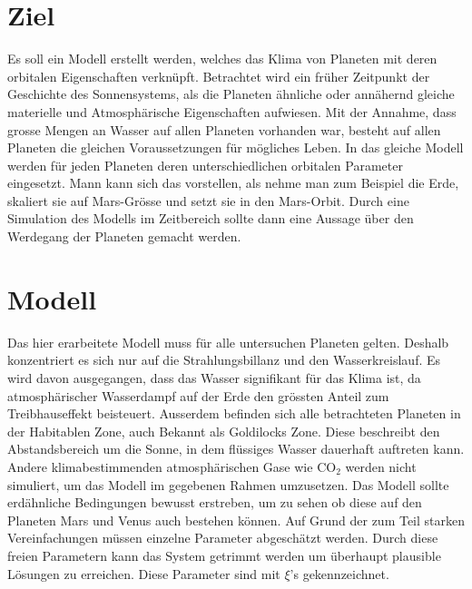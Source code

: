 \begin{refsection}

\section{Ziel}
Es soll ein Modell erstellt werden, welches das Klima von Planeten mit deren orbitalen Eigenschaften verknüpft.
Betrachtet wird ein früher Zeitpunkt der Geschichte des Sonnensystems, als die Planeten ähnliche oder annähernd gleiche materielle und Atmosphärische Eigenschaften aufwiesen.
Mit der Annahme, dass grosse Mengen an Wasser auf allen Planeten vorhanden war, besteht auf allen Planeten die gleichen Voraussetzungen für mögliches Leben.
In das gleiche Modell werden für jeden Planeten deren unterschiedlichen orbitalen Parameter eingesetzt. Mann kann sich das vorstellen, als nehme man zum Beispiel die Erde, skaliert sie auf Mars-Grösse und setzt sie in den Mars-Orbit. 
Durch eine Simulation des Modells im Zeitbereich sollte dann eine Aussage über den Werdegang der Planeten gemacht werden.

\section{Modell}


	

	
	
	
	Das hier erarbeitete Modell muss für alle untersuchen Planeten gelten. Deshalb konzentriert es sich nur auf die Strahlungsbillanz und den Wasserkreislauf. Es wird davon ausgegangen, dass das Wasser signifikant für das Klima ist, da atmosphärischer Wasserdampf auf der Erde den grössten Anteil zum Treibhauseffekt beisteuert. Ausserdem befinden sich alle betrachteten Planeten in der Habitablen Zone, auch Bekannt als Goldilocks Zone. Diese beschreibt den Abstandsbereich um die Sonne, in dem flüssiges Wasser dauerhaft auftreten kann.
	Andere klimabestimmenden atmosphärischen Gase wie $\text{CO}_\text{2}$ werden nicht simuliert, um das Modell im gegebenen Rahmen umzusetzen.
	Das Modell sollte erdähnliche Bedingungen bewusst erstreben, um zu sehen ob diese auf den Planeten Mars und Venus auch bestehen können.
Auf Grund der zum Teil starken Vereinfachungen müssen einzelne Parameter abgeschätzt werden. Durch diese freien Parametern kann das System getrimmt werden um überhaupt plausible Lösungen zu erreichen. Diese Parameter sind mit $\xi$'s gekennzeichnet.


\end{refsection}
